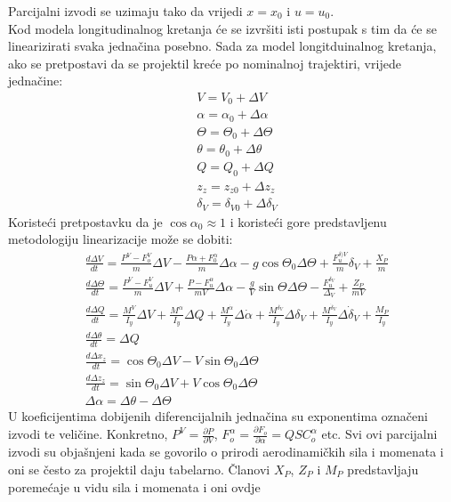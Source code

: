 Parcijalni izvodi se uzimaju tako da vrijedi $x=x_0$ i $u=u_0$.\\
Kod modela longitudinalnog kretanja će se izvršiti isti postupak s tim da će se linearizirati svaka 
jednačina posebno. Sada za model longitduinalnog kretanja, ako se pretpostavi da se 
projektil kreće po nominalnoj trajektiri, vrijede jednačine:
\begin{align}
    &V=V_0+\Delta V \\
    & \alpha = \alpha _0+\Delta \alpha\\
    & \Theta=\Theta _0 +\Delta \Theta\\
    & \theta= \theta _0+\Delta \theta\\
    & Q=Q_0+\Delta Q\\
    & z_z=z_{z0}+\Delta z_z\\
    & \delta _V=\delta _{V0}+\Delta \delta _V
\end{align}
Koristeći pretpostavku da je $\cos\alpha_0 \approx 1$ i koristeći gore predstavljenu metodologiju 
linearizacije može se dobiti:
\begin{align}
    &\frac{d\Delta V}{dt}=\frac{P^V-F_o^V}{m}\Delta V - \frac{P\alpha+F_0^\alpha}{m}\Delta\alpha - g\cos\Theta _0\Delta\Theta +\frac{F_u^{\delta )V}}{m}\delta_V+\frac{X_P}{m}\\
    &\frac{d\Delta \Theta}{dt}=\frac{P^V-F_u^V}{m}\Delta V + \frac{P-F_u^\alpha}{mV}\Delta \alpha-\frac{g}{V}\sin\Theta\Delta\Theta-\frac{F_u^{\delta_V}}{\Delta_V}+\frac{Z_P}{mV}\\
    &\frac{d\Delta Q}{dt}=\frac{M^V}{I_y}\Delta V+\frac{M^\alpha}{I_y}\Delta Q+\frac{M^{\dot{\alpha}}}{I_y}\Delta\dot{\alpha}+\frac{M^{\delta_V}}{I_y}\Delta \delta_V+\frac{M^{\dot{\delta}_V}}{I_y}\Delta \dot{\delta}_V+\frac{M_P}{I_y} \\
    &\frac{d\Delta \theta}{dt}=\Delta Q \\
    &\frac{d\Delta x_z}{dt}=\cos\Theta_0\Delta V-V\sin\Theta_0\Delta\Theta\\
    &\frac{d\Delta z_z}{dt}=\sin\Theta_0\Delta V+V\cos\Theta_0\Delta\Theta \\
    &\Delta\alpha=\Delta\theta - \Delta\Theta
\end{align}
U koeficijentima dobijenih diferencijalnih jednačina su exponentima označeni izvodi te veličine. Konkretno, 
$P^V=\frac{\partial P}{\partial V}$, $F_o^\alpha = \frac{\partial F_o}{\partial \alpha} = QSC_o^\alpha$ etc. 
Svi ovi parcijalni izvodi su objašnjeni kada se govorilo o prirodi aerodinamičkih sila i momenata i oni se često 
za projektil daju tabelarno. Članovi $X_P$, $Z_P$ i $M_P$ predstavljaju poremećaje u vidu sila i momenata i oni ovdje 
